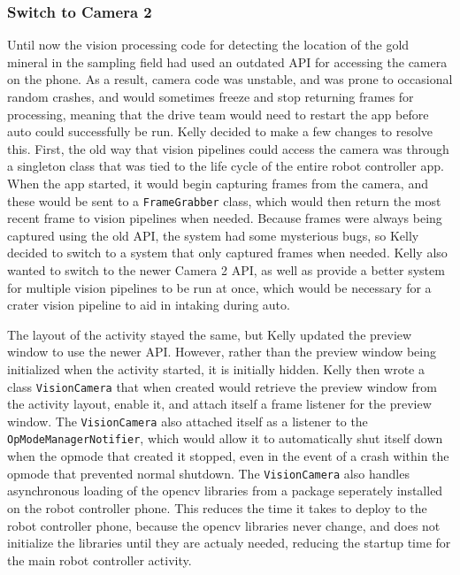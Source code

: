 \documentclass{article}
\begin{document}
\subsubsection{Switch to Camera 2}
Until now the vision processing code for detecting the location of the gold mineral in the sampling field had used an outdated API for accessing the camera on the phone. As a result, camera code was unstable, and was prone to occasional random crashes, and would sometimes freeze and stop returning frames for processing, meaning that the drive team would need to restart the app before auto could successfully be run. Kelly decided to make a few changes to resolve this. First, the old way that vision pipelines could access the camera was through a singleton class that was tied to the life cycle of the entire robot controller app. When the app started, it would begin capturing frames from the camera, and these would be sent to a \texttt{FrameGrabber} class, which would then return the most recent frame to vision pipelines when needed. Because frames were always being captured using the old API, the system had some mysterious bugs, so Kelly decided to switch to a system that only captured frames when needed. Kelly also wanted to switch to the newer Camera 2 API, as well as provide a better system for multiple vision pipelines to be run at once, which would be necessary for a crater vision pipeline to aid in intaking during auto.

The layout of the activity stayed the same, but Kelly updated the preview window to use the newer API. However, rather than the preview window being initialized when the activity started, it is initially hidden. Kelly then wrote a class \texttt{VisionCamera} that when created would retrieve the preview window from the activity layout, enable it, and attach itself a frame listener for the preview window. The  \texttt{VisionCamera} also attached itself as a listener to the \texttt{OpModeManagerNotifier}, which would allow it to automatically shut itself down when the opmode that created it stopped, even in the event of a crash within the opmode that prevented normal shutdown. The \texttt{VisionCamera} also handles asynchronous loading of the opencv libraries from a package seperately installed on the robot controller phone. This reduces the time it takes to deploy to the robot controller phone, because the opencv libraries never change, and does not initialize the libraries until they are actualy needed, reducing the startup time for the main robot controller activity. 
\end{document}
